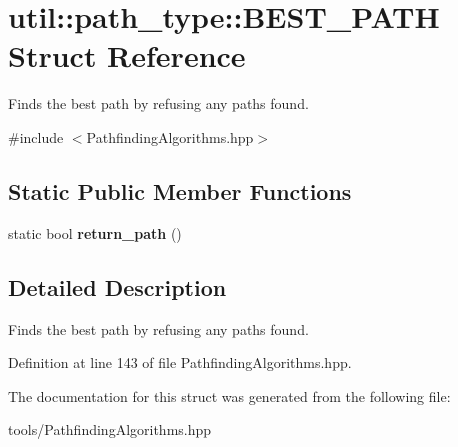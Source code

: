 \hypertarget{structutil_1_1path__type_1_1_b_e_s_t___p_a_t_h}{}\section{util\+:\+:path\+\_\+type\+:\+:B\+E\+S\+T\+\_\+\+P\+A\+TH Struct Reference}
\label{structutil_1_1path__type_1_1_b_e_s_t___p_a_t_h}


Finds the best path by refusing any paths found.  




{\ttfamily \#include $<$Pathfinding\+Algorithms.\+hpp$>$}

\subsection*{Static Public Member Functions}
\begin{DoxyCompactItemize}
\item 
static bool {\bfseries return\+\_\+path} ()\hypertarget{structutil_1_1path__type_1_1_b_e_s_t___p_a_t_h_a61f3304ea997981f8e29774c3b2a56c8}{}\label{structutil_1_1path__type_1_1_b_e_s_t___p_a_t_h_a61f3304ea997981f8e29774c3b2a56c8}

\end{DoxyCompactItemize}


\subsection{Detailed Description}
Finds the best path by refusing any paths found. 

Definition at line 143 of file Pathfinding\+Algorithms.\+hpp.



The documentation for this struct was generated from the following file\+:\begin{DoxyCompactItemize}
\item 
tools/Pathfinding\+Algorithms.\+hpp\end{DoxyCompactItemize}
